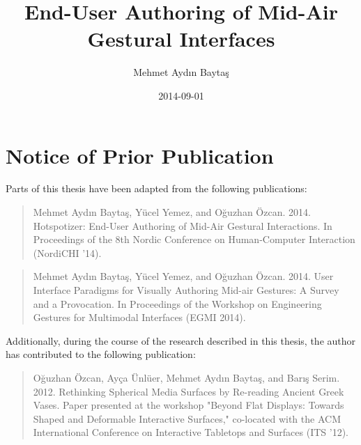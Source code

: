 \documentclass[10pt, twoside]{book}
\begin{document}
\frontmatter

\title{End-User Authoring of Mid-Air Gestural Interfaces}
\author{Mehmet Aydın Baytaş}
\date{2014-09-01}

\maketitle
%
%

\chapter*{Notice of Prior Publication}

Parts of this thesis have been adapted from the following publications:

\begin{quote}
Mehmet Aydın Baytaş, Yücel Yemez, and Oğuzhan Özcan. 2014. Hotspotizer: End-User Authoring of Mid-Air Gestural Interactions. In Proceedings of the 8th Nordic Conference on Human-Computer Interaction (NordiCHI '14).
\end{quote}

\begin{quote}
Mehmet Aydın Baytaş, Yücel Yemez, and Oğuzhan Özcan. 2014. User Interface Paradigms for Visually Authoring Mid-air Gestures: A Survey and a Provocation. In Proceedings of the Workshop on Engineering Gestures for Multimodal Interfaces (EGMI 2014).
\end{quote}

Additionally, during the course of the research described in this thesis, the author has contributed to the following publication:

\begin{quote}
Oğuzhan Özcan, Ayça Ünlüer, Mehmet Aydın Baytaş, and Barış Serim. 2012. Rethinking Spherical Media Surfaces by Re-reading Ancient Greek Vases. Paper presented at the workshop "Beyond Flat Displays: Towards Shaped and Deformable Interactive Surfaces," co-located with the ACM International Conference on Interactive Tabletops and Surfaces (ITS '12).
\end{quote}
\end{document}
